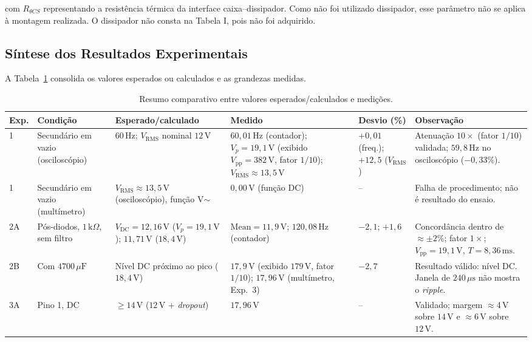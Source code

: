 com $R_{\theta CS}$ representando a resistência térmica da interface caixa--dissipador. Como não foi utilizado dissipador, esse parâmetro não se aplica à montagem realizada. O dissipador não consta na Tabela I, pois não foi adquirido.

\subsection{Síntese dos Resultados Experimentais}

A Tabela~\ref{tab:resumo} consolida os valores esperados ou calculados e as grandezas medidas.

\begin{table}[t]
\renewcommand{\tablename}{TABELA}
\caption{Resumo comparativo entre valores esperados/calculados e medições.}
\label{tab:resumo}
\centering
\scriptsize
\setlength{\tabcolsep}{4pt}
\begin{tabular}{lp{2.4cm}p{3.1cm}p{3.3cm}p{1.5cm}p{4.9cm}}
\hline
Exp. & Condição & Esperado/calculado & Medido & Desvio (\%) & Observação \\
\hline
1 & Secundário em vazio (osciloscópio) & $60\,\text{Hz}$; $V_{\text{RMS}}$ nominal $12\,\text{V}$ & $60{,}01\,\text{Hz}$ (contador); $V_{p} = 19{,}1\,\text{V}$ (exibido $V_{\text{pp}} = 382\,\text{V}$, fator $1/10$); $V_{\text{RMS}} \approx 13{,}5\,\text{V}$ & $+0{,}01$ (freq.); $+12{,}5$ ($V_{\text{RMS}}$) & Atenuação $10\times$ (fator $1/10$) validada; $59{,}8\,\text{Hz}$ no osciloscópio ($-0{,}33\%$). \\
1 & Secundário em vazio (multímetro) & $V_{\text{RMS}} \approx 13{,}5\,\text{V}$ (osciloscópio), função V$\sim$ & $0{,}00\,\text{V}$ (função DC) & -- & Falha de procedimento; não é resultado do ensaio. \\
2A & Pós-diodos, $1\,\text{k}\Omega$, sem filtro & $V_{\text{DC}} = 12{,}16\,\text{V}$ ($V_p = 19{,}1\,\text{V}$); $11{,}71\,\text{V}$ ($18{,}4\,\text{V}$) & $\text{Mean} = 11{,}9\,\text{V}$; $120{,}08\,\text{Hz}$ (contador) & $-2{,}1$; $+1{,}6$ & Concordância dentro de $\approx \pm 2\%$; fator $1\times$; $V_{\text{pp}} = 19{,}1\,\text{V}$, $T = 8{,}36\,\text{ms}$. \\
2B & Com $4700\,\mu\text{F}$ & Nível DC próximo ao pico ($18{,}4\,\text{V}$) & $17{,}9\,\text{V}$ (exibido $179\,\text{V}$, fator $1/10$); $17{,}96\,\text{V}$ (multímetro, Exp.~3) & $-2{,}7$ & Resultado válido: nível DC. Janela de $240\,\mu\text{s}$ não mostra o \textit{ripple}. \\
3A & Pino 1, DC & $\geq 14\,\text{V}$ ($12\,\text{V}$ + \textit{dropout}) & $17{,}96\,\text{V}$ & -- & Validado; margem $\approx 4\,\text{V}$ sobre $14\,\text{V}$ e $\approx 6\,\text{V}$ sobre $12\,\text{V}$. \\

\end{tabular}
\end{table}
